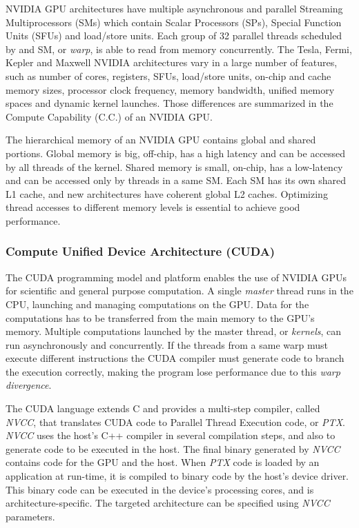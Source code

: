 NVIDIA GPU architectures have multiple asynchronous and parallel Streaming
Multiprocessors (SMs) which contain Scalar Processors (SPs), Special Function
Units (SFUs) and load/store units. Each group of 32 parallel threads scheduled
by and SM, or \textit{warp}, is able to read from memory concurrently.  The
Tesla, Fermi, Kepler and Maxwell NVIDIA architectures vary in a large number of
features, such as number of cores, registers, SFUs, load/store units, on-chip
and cache memory sizes, processor clock frequency, memory bandwidth, unified
memory spaces and dynamic kernel launches.  Those differences are summarized in
the Compute Capability (C.C.) of an NVIDIA GPU.

The hierarchical memory of an NVIDIA GPU contains global and shared portions.
Global memory is big, off-chip, has a high latency and can be accessed by all
threads of the kernel.  Shared memory is small, on-chip, has a low-latency and
can be accessed only by threads in a same SM.  Each SM has its own shared L1
cache, and new architectures have coherent global L2 caches.  Optimizing thread
accesses to different memory levels is essential to achieve good performance.

\subsubsection{Compute Unified Device Architecture (CUDA)}

The CUDA programming model and platform enables the use of NVIDIA GPUs for
scientific and general purpose computation.  A single \textit{master} thread
runs in the CPU, launching and managing computations on the GPU.  Data for the
computations has to be transferred from the main memory to the GPU's memory.
Multiple computations launched by the master thread, or \textit{kernels}, can
run asynchronously and concurrently. If the threads from a same warp must
execute different instructions the CUDA compiler must generate code to branch
the execution correctly, making the program lose performance due to this
\textit{warp divergence}.

The CUDA language extends C and provides a multi-step compiler, called
\textit{NVCC}, that translates CUDA code to Parallel Thread Execution code, or
\textit{PTX}.  \textit{NVCC} uses the host's C++ compiler in several
compilation steps, and also to generate code to be executed in the host. The
final binary generated by \textit{NVCC} contains code for the GPU and the host.
When \textit{PTX} code is loaded by an application at run-time, it is compiled
to binary code by the host's device driver.  This binary code can be executed
in the device's processing cores, and is architecture-specific.  The targeted
architecture can be specified using \textit{NVCC} parameters.

